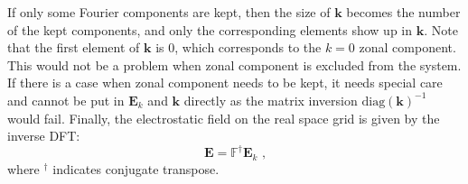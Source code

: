 \documentclass[12pt]{article}
\begin{document}
If only some Fourier components are kept, then the size of $\boldsymbol{k}$ becomes the number of the kept components, and only the corresponding elements show up in $\boldsymbol{k}$.
Note that the first element of $\boldsymbol{k}$ is 0, which corresponds to the $k = 0$ zonal component.
This would not be a problem when zonal component is excluded from the system.
If there is a case when zonal component needs to be kept, it needs special care and cannot be put in $\boldsymbol{E}_k$ and $\boldsymbol{k}$ directly as the matrix inversion $\mathrm{diag}(\boldsymbol{k})^{-1}$ would fail. Finally, the electrostatic field on the real space grid is given by the inverse DFT:
\begin{equation}
	\boldsymbol{E} = \mathbb{F}^\dagger \boldsymbol{E}_k \textrm{ ,}
\end{equation}
where $^\dagger$ indicates conjugate transpose.
\end{document}
